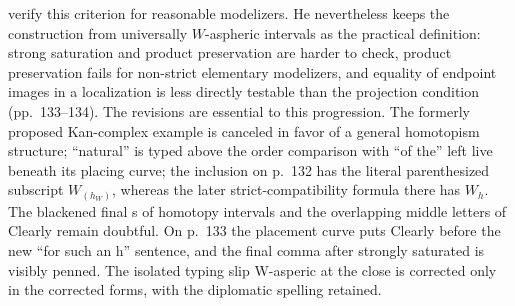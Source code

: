 \documentclass[10pt,oneside]{book}
\begin{document}
verify this criterion for reasonable modelizers. He nevertheless keeps the construction from universally $W$-aspheric intervals as the practical definition: strong saturation and product preservation are harder to check, product preservation fails for non-strict elementary modelizers, and equality of endpoint images in a localization is less directly testable than the projection condition (pp.~133--134). The revisions are essential to this progression. The formerly proposed Kan-complex example is canceled in favor of a general homotopism structure; ``natural'' is typed above the order comparison with ``of the'' left live beneath its placing curve; the inclusion on p.~132 has the literal parenthesized subscript $W_{(h_W)}$, whereas the later strict-compatibility formula there has $W_h$. The blackened final s of homotopy intervals and the overlapping middle letters of Clearly remain doubtful. On p.~133 the placement curve puts Clearly before the new ``for such an h'' sentence, and the final comma after strongly saturated is visibly penned. The isolated typing slip W-asperic at the close is corrected only in the corrected forms, with the diplomatic spelling retained.
\end{document}
